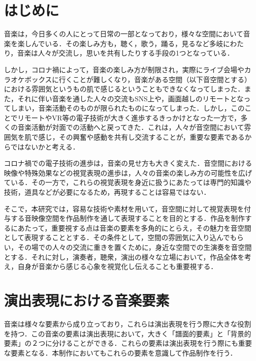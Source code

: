
\section{はじめに}

音楽は，今日多くの人にとって日常の一部となっており，様々な空間において音楽を楽しんでいる．その楽しみ方も，聴く，歌う，踊る，見るなど多岐にわたり，音楽は人々が交流し，思いを共有したりする手段の1つとなっている．

しかし，コロナ禍によって，音楽の楽しみ方が制限され，実際にライブ会場やカラオケボックスに行くことが難しくなり，音楽がある空間（以下音空間とする）における雰囲気というもの肌で感じるということもできなくなってしまった．また，それに伴い音楽を通した人々の交流もSNS上や，画面越しのリモートとなってしまい，音楽活動そのものが限られたものになってしまった．しかし，このことでリモートやVR等の電子技術が大きく進歩するきっかけとなった一方で，多くの音楽活動が対面での活動へと戻ってきた．これは，人々が音空間において雰囲気を肌で感じ，その興奮や感動を共有し交流することが，重要な要素であるからではないかと考える．

コロナ禍での電子技術の進歩は，音楽の見せ方も大きく変えた．音空間における映像や特殊効果などの視覚表現の進歩は，人々の音楽の楽しみ方の可能性を広げている．その一方で，これらの視覚表現を身近に扱うにあたっては専門的知識や技術，道具などが必要になるため，再現することは容易ではない．

そこで，本研究では，容易な技術や素材を用いて，音空間に対して視覚表現を付与する音映像空間を作品制作を通して表現することを目的とする．作品を制作するにあたって，重要視する点は音楽の要素を多角的にとらえ，その魅力を音空間として表現することとする．その条件として，空間の雰囲気に入り込んでもらい，その場での人々の交流に重きを置くために，身近な空間での生演奏を音空間とする．それに対し，演奏者，聴衆，演出の様々な立場において，作品全体を考え，自身が音楽から感じる心象を視覚化し伝えることも重要視する．


\section{演出表現における音楽要素}


音楽は様々な要素から成り立っており，これらは演出表現を行う際に大きな役割を持つ．この音楽の要素は演出表現において，大きく「譜面的要素」と「背景的要素」の２つに分けることができる．これらの要素は演出表現を行う際にも重要な要素となる．本制作においてもこれらの要素を意識して作品制作を行う．
